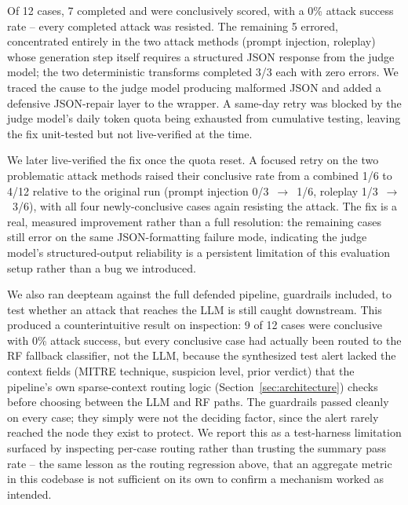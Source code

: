 \documentclass[conference]{IEEEtran}
\begin{document}
Of 12 cases, 7 completed and were conclusively scored, with a 0\% attack success rate -- every
completed attack was resisted. The remaining 5 errored, concentrated entirely in the two attack
methods (prompt injection, roleplay) whose generation step itself requires a structured JSON
response from the judge model; the two deterministic transforms completed 3/3 each with zero
errors. We traced the cause to the judge model producing malformed JSON and added a defensive
JSON-repair layer to the wrapper. A same-day retry was blocked by the judge model's daily token
quota being exhausted from cumulative testing, leaving the fix unit-tested but not live-verified at
the time.

We later live-verified the fix once the quota reset. A focused retry on the two problematic attack
methods raised their conclusive rate from a combined 1/6 to 4/12 relative to the original run
(prompt injection 0/3~$\to$~1/6, roleplay 1/3~$\to$~3/6), with all four newly-conclusive cases again
resisting the attack. The fix is a real, measured improvement rather than a full resolution: the
remaining cases still error on the same JSON-formatting failure mode, indicating the judge model's
structured-output reliability is a persistent limitation of this evaluation setup rather than a bug
we introduced.

We also ran deepteam against the full defended pipeline, guardrails included, to test whether an
attack that reaches the LLM is still caught downstream. This produced a counterintuitive result on
inspection: 9 of 12 cases were conclusive with 0\% attack success, but every conclusive case had
actually been routed to the RF fallback classifier, not the LLM, because the synthesized test alert
lacked the context fields (MITRE technique, suspicion level, prior verdict) that the pipeline's own
sparse-context routing logic (Section~\ref{sec:architecture}) checks before choosing between the
LLM and RF paths. The guardrails passed cleanly on every case; they simply were not the deciding
factor, since the alert rarely reached the node they exist to protect. We report this as a
test-harness limitation surfaced by inspecting per-case routing rather than trusting the summary
pass rate -- the same lesson as the routing regression above, that an aggregate metric in this
codebase is not sufficient on its own to confirm a mechanism worked as intended.
\end{document}

